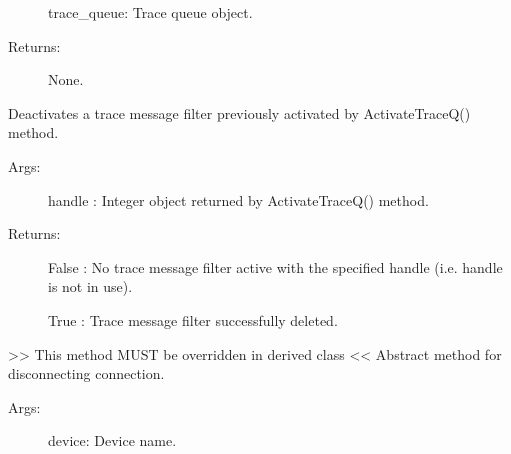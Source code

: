 \documentclass[letterpaper,10pt,english]{sphinxmanual}
\begin{document}
\begin{fulllineitems}
\begin{fulllineitems}
\begin{description}
\sphinxAtStartPar
trace\_queue: Trace queue object.

\item[{Returns:}] \leavevmode
\sphinxAtStartPar
None.

\end{description}

\end{fulllineitems}


\begin{fulllineitems}
\label{\detokenize{QConnectionLibrary:QConnectionLibrary.connection_base.ConnectionBase.deactivate_trace_queue}}
\sphinxAtStartPar
Deactivates a trace message filter previously activated by ActivateTraceQ() method.
\begin{description}
\item[{Args:}] \leavevmode
\sphinxAtStartPar
handle :  Integer object returned by ActivateTraceQ() method.

\item[{Returns:}] \leavevmode
\sphinxAtStartPar
False : No trace message filter active with the specified handle (i.e. handle is not in use).

\sphinxAtStartPar
True :  Trace message filter successfully deleted.

\end{description}

\end{fulllineitems}


\begin{fulllineitems}
\label{\detokenize{QConnectionLibrary:QConnectionLibrary.connection_base.ConnectionBase.disconnect}}
\sphinxAtStartPar
\textgreater{}\textgreater{} This method MUST be overridden in derived class \textless{}\textless{}
Abstract method for disconnecting connection.
\begin{description}
\item[{Args:}] \leavevmode
\sphinxAtStartPar
device: Device name.


\end{description}
\end{fulllineitems}
\end{fulllineitems}
\end{document}
